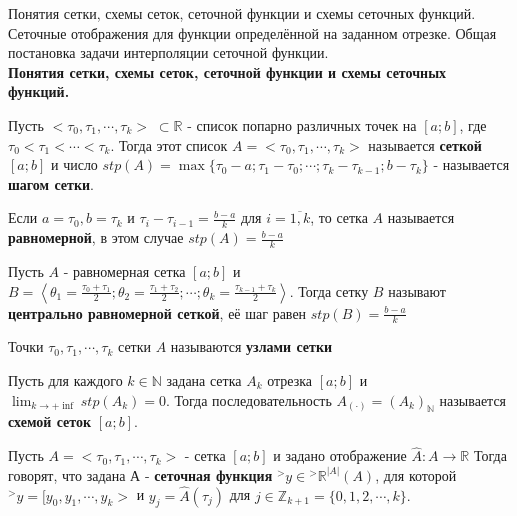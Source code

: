 \documentclass[__main__.tex]{subfiles}
\begin{document}
Понятия сетки, схемы сеток, сеточной функции и схемы сеточных функций. Сеточные отображения для функции определённой на заданном отрезке. Общая постановка задачи интерполяции сеточной функции.\\

\textbf{ Понятия сетки, схемы сеток, сеточной функции и схемы сеточных функций. }

\begin{definition}
Пусть $<\tau_0, \tau_1, \cdots, \tau_k>\; \subset \mathbb{R}$ - список попарно различных точек на $[a; b]$, где $\tau_0 < \tau_1 < \cdots < \tau_k$. Тогда этот список $A =  <\tau_0, \tau_1, \cdots, \tau_k>$ называется \textbf{сеткой} $[a; b]$ и число $stp(A) = \max\{\tau_0 - a; \tau_1 - \tau_0; \cdots; \tau_k - \tau_{k - 1}; b - \tau_k\}$ - называется \textbf{шагом сетки}.
\end{definition} 

\begin{definition}
Если $a = \tau_0, b = \tau_k$ и $\tau_i - \tau_{i - 1} = \frac{b - a}{k}$ для $i = \overline{1, k}$, то сетка $A$ называется \textbf{равномерной}, в этом случае $stp(A) = \frac{b - a}{k}$
\end{definition}

\begin{definition}
Пусть $A$ - равномерная сетка $[a; b]$ и $B = \left< \theta_1 = \frac{\tau_0 + \tau_1}{2}; \theta_2 = \frac{\tau_1 + \tau_2}{2}; \cdots; \theta_k = \frac{\tau_{k - 1} + \tau_{k}}{2} \right>$. Тогда сетку $B$ называют \textbf{центрально равномерной сеткой}, её шаг равен $stp(B) = \frac{b - a}{k}$
\end{definition}

\begin{definition}
Точки $\tau_0, \tau_1, \cdots, \tau_k$ сетки $A$ называются \textbf{узлами сетки}
\end{definition}

\begin{definition}
Пусть для каждого $k \in \mathbb{N}$ задана сетка $A_k$ отрезка $[a; b]$ и $\lim_{k \to +\inf} stp(A_k) = 0$. Тогда последовательность $A_{(\cdot)} = (A_k)_{\mathbb{N}}$ называется \textbf{схемой сеток} $[a; b]$.
\end{definition}

\begin{definition}
Пусть $A = <\tau_0, \tau_1, \cdots, \tau_k>$ - сетка $[a; b]$ и задано отображение $\hat{A}: A \to \mathbb{R}$ Тогда говорят, что задана А - \textbf{сеточная функция} ${}^{>}y \in {}^{>} \mathbb{R}^{|A|}(A)$, для которой ${}^{>}y = [y_0, y_1, \cdots, y_k>$ и $y_j = \hat{A}(\tau_j)$ для $j \in \mathbb{Z}_{k+1} = \{0, 1, 2, \cdots, k\}.$ 
\end{definition}
\end{document}
